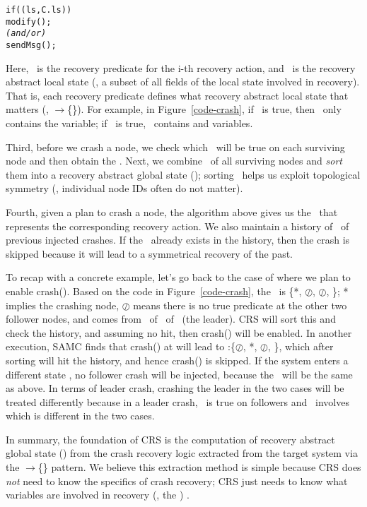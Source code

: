 \vmintwo
\begin{alltt}
    if (\pri(ls, C.ls)) 
       modify(\ralsi); 
       \textit{(and/or)}
       sendMsg(\ralsi);
\end{alltt}
\vmintwo

Here, \pri\ is the recovery predicate for the i-th recovery action, and 
\ralsi\ is the recovery abstract local state 
(\ie, a subset of all fields of the local state involved in 
recovery).  That is, each recovery predicate defines what recovery
abstract local state that matters (\ie, \pri$\rightarrow$\{\ralsi\}).  For example, in Figure~\ref{code-crash},
if \prone\ is true, then \ralsone\ only contains the 
variable; if \prtri\ is true, \ralstri\ contains 
and  variables.

Third, before we crash a node, we check which \pri\ will be true on
each surviving node and then obtain the \ralsi.  Next, we combine
\ralsi\ of all surviving nodes and {\em sort} them into a recovery
abstract global state (\rags);  sorting \rags\ helps us exploit
topological symmetry (\eg,  individual node IDs often do not matter).


Fourth, given a plan to crash a node, the algorithm above 
gives us the \rags\ that represents the corresponding recovery action.
We also maintain a history of \rags\ of previous injected crashes.
If the \rags\ already exists in the history, then the crash is skipped
because it will lead to a symmetrical recovery of the past.


To recap with a concrete example, let's go back to the case
of  where we plan to enable crash(\none).  Based on the code
in Figure~\ref{code-crash}, the \rags\ is \{*, $\oslash$,
$\oslash$, \}; 
* implies the crashing node, 
$\oslash$ means there is no true
predicate at the other two follower nodes, and  comes
from \ralsone\ of \prone\ of \nfour\ (the leader).  CRS will sort this
and check the history, and assuming no hit, then crash(\none) will be
enabled.  In another execution, SAMC finds that crash(\ntwo)
at  will lead to \rags:\{$\oslash$, *,
$\oslash$, \}, which after sorting will hit the
history, and hence crash(\ntwo) is skipped.  If the system enters a
different state , no follower crash will be injected, because
the \rags\ will be the same as above.  In terms of leader crash,
crashing the leader in the two cases will be treated differently
because in a leader crash, \prtri\ is true on followers and \prtri\
involves  which is different in the two cases.

In summary, the foundation of CRS is the computation of recovery
abstract global state (\rags) from the crash recovery logic extracted
from the target system via the \pri$\rightarrow$\{\ralsi\} pattern.
We believe this extraction method is simple because CRS does {\em not}
need to know the specifics of crash recovery; CRS just needs to know
what variables are involved in recovery (\ie, the \rals) .


